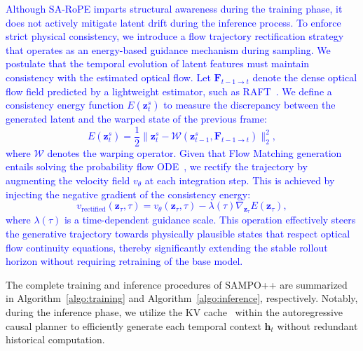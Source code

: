 \textcolor{blue}{Although SA-RoPE imparts structural awareness during the training phase, it does not actively mitigate latent drift during the inference process. To enforce strict physical consistency, we introduce a flow trajectory rectification strategy that operates as an energy-based guidance mechanism during sampling. We postulate that the temporal evolution of latent features must maintain consistency with the estimated optical flow. Let $\boldsymbol{F}_{t-1 \to t}$ denote the dense optical flow field predicted by a lightweight estimator, such as RAFT~\cite{teed2020raft}. We define a consistency energy function $E(\boldsymbol{z}_t^s)$ to measure the discrepancy between the generated latent and the warped state of the previous frame:
\begin{equation}
    E(\boldsymbol{z}_t^s) = \frac{1}{2} \| \boldsymbol{z}_t^s - \mathcal{W}(\boldsymbol{z}_{t-1}^s, \boldsymbol{F}_{t-1 \to t}) \|_2^2,
\end{equation}
where $\mathcal{W}$ denotes the warping operator. Given that Flow Matching generation entails solving the probability flow ODE~\cite{lipman2023flow, albergo2025stochastic}, we rectify the trajectory by augmenting the velocity field $v_\theta$ at each integration step. This is achieved by injecting the negative gradient of the consistency energy:
\begin{equation}
    v_{\text{rectified}}(\boldsymbol{z}_\tau, \tau) = v_\theta(\boldsymbol{z}_\tau, \tau) - \lambda(\tau) \nabla_{\boldsymbol{z}_\tau} E(\boldsymbol{z}_\tau),
\end{equation}
where $\lambda(\tau)$ is a time-dependent guidance scale. This operation effectively steers the generative trajectory towards physically plausible states that respect optical flow continuity equations, thereby significantly extending the stable rollout horizon without requiring retraining of the base model.}

The complete training and inference procedures of SAMPO++ are summarized in Algorithm~\ref{algo:training} and Algorithm~\ref{algo:inference}, respectively. Notably, during the inference phase, we utilize the KV cache~\cite{pope2023efficiently} within the autoregressive causal planner to efficiently generate each temporal context $\boldsymbol{h}_t$ without redundant historical computation.
